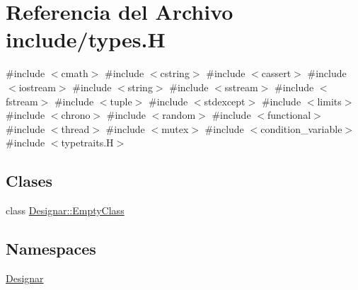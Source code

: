 \hypertarget{types_8_h}{}\section{Referencia del Archivo include/types.H}
\label{types_8_h}
{\ttfamily \#include $<$cmath$>$}\newline
{\ttfamily \#include $<$cstring$>$}\newline
{\ttfamily \#include $<$cassert$>$}\newline
{\ttfamily \#include $<$iostream$>$}\newline
{\ttfamily \#include $<$string$>$}\newline
{\ttfamily \#include $<$sstream$>$}\newline
{\ttfamily \#include $<$fstream$>$}\newline
{\ttfamily \#include $<$tuple$>$}\newline
{\ttfamily \#include $<$stdexcept$>$}\newline
{\ttfamily \#include $<$limits$>$}\newline
{\ttfamily \#include $<$chrono$>$}\newline
{\ttfamily \#include $<$random$>$}\newline
{\ttfamily \#include $<$functional$>$}\newline
{\ttfamily \#include $<$thread$>$}\newline
{\ttfamily \#include $<$mutex$>$}\newline
{\ttfamily \#include $<$condition\+\_\+variable$>$}\newline
{\ttfamily \#include $<$typetraits.\+H$>$}\newline
\subsection*{Clases}
\begin{DoxyCompactItemize}
\item 
class \hyperlink{class_designar_1_1_empty_class}{Designar\+::\+Empty\+Class}
\end{DoxyCompactItemize}
\subsection*{Namespaces}
\begin{DoxyCompactItemize}
\item 
 \hyperlink{namespace_designar}{Designar}
\end{DoxyCompactItemize}
